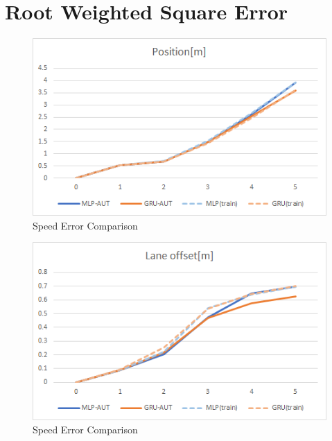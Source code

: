\section{Root Weighted Square Error}


\begin{figure}[H]
\begin{center}
\includegraphics[width=14cm]{./figures/graph_position.png}
\caption{Speed Error Comparison}
\label{fig:graph_position}
\end{center}
\end{figure}

\begin{figure}[H]
\begin{center}
\includegraphics[width=14cm]{./figures/graph_lane.png}
\caption{Speed Error Comparison}
\label{fig:graph_lane}
\end{center}
\end{figure}

